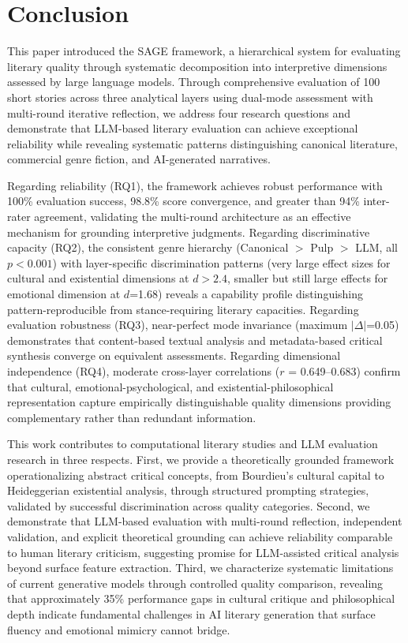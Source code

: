 \section{Conclusion}
\label{sec:conclusion}

This paper introduced the SAGE framework, a hierarchical system for evaluating literary quality through systematic decomposition into interpretive dimensions assessed by large language models. Through comprehensive evaluation of 100 short stories across three analytical layers using dual-mode assessment with multi-round iterative reflection, we address four research questions and demonstrate that LLM-based literary evaluation can achieve exceptional reliability while revealing systematic patterns distinguishing canonical literature, commercial genre fiction, and AI-generated narratives.

Regarding reliability (RQ1), the framework achieves robust performance with 100\% evaluation success, 98.8\% score convergence, and greater than 94\% inter-rater agreement, validating the multi-round architecture as an effective mechanism for grounding interpretive judgments. Regarding discriminative capacity (RQ2), the consistent genre hierarchy (Canonical $>$ Pulp $>$ LLM, all $p<0.001$) with layer-specific discrimination patterns (very large effect sizes for cultural and existential dimensions at $d>2.4$, smaller but still large effects for emotional dimension at $d$=1.68) reveals a capability profile distinguishing pattern-reproducible from stance-requiring literary capacities. Regarding evaluation robustness (RQ3), near-perfect mode invariance (maximum $|\Delta|$=0.05) demonstrates that content-based textual analysis and metadata-based critical synthesis converge on equivalent assessments. Regarding dimensional independence (RQ4), moderate cross-layer correlations ($r$ = 0.649--0.683) confirm that cultural, emotional-psychological, and existential-philosophical representation capture empirically distinguishable quality dimensions providing complementary rather than redundant information.

This work contributes to computational literary studies and LLM evaluation research in three respects. First, we provide a theoretically grounded framework operationalizing abstract critical concepts, from Bourdieu's cultural capital to Heideggerian existential analysis, through structured prompting strategies, validated by successful discrimination across quality categories. Second, we demonstrate that LLM-based evaluation with multi-round reflection, independent validation, and explicit theoretical grounding can achieve reliability comparable to human literary criticism, suggesting promise for LLM-assisted critical analysis beyond surface feature extraction. Third, we characterize systematic limitations of current generative models through controlled quality comparison, revealing that approximately 35\% performance gaps in cultural critique and philosophical depth indicate fundamental challenges in AI literary generation that surface fluency and emotional mimicry cannot bridge.

